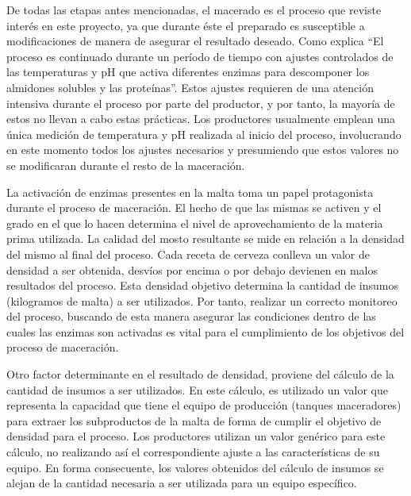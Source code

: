 	\par
	De todas las etapas antes mencionadas, el macerado es el proceso que reviste interés en este proyecto, ya que durante éste el preparado es susceptible a modificaciones de manera de asegurar el resultado deseado. Como explica \cite{Papazian} “El proceso es continuado durante un período de tiempo con ajustes controlados de las temperaturas y pH que activa diferentes enzimas para descomponer los almidones solubles y las proteínas”. Estos ajustes requieren de una atención intensiva durante el proceso por parte del productor, y por tanto, la mayoría de estos no llevan a cabo estas prácticas. Los productores usualmente emplean una única medición de temperatura y pH realizada al inicio del proceso, involucrando en este momento todos los ajustes necesarios y presumiendo que estos valores no se modificaran durante el resto de la maceración.
	\par
	La activación de enzimas presentes en la malta toma un papel protagonista durante el proceso de maceración. El hecho de que las mismas se activen y el grado en el que lo hacen determina el nivel de aprovechamiento de la materia prima utilizada. La calidad del mosto resultante se mide en relación a la densidad del mismo al final del proceso. Cada receta de cerveza conlleva un valor de densidad a ser obtenida, desvíos por encima o por debajo devienen en malos resultados del proceso. Esta densidad objetivo determina la cantidad de insumos (kilogramos de malta) a ser utilizados. Por tanto, realizar un correcto monitoreo del proceso, buscando de esta manera asegurar las condiciones dentro de las cuales las enzimas son activadas es vital para el cumplimiento de los objetivos del proceso de maceración.
	
	\par
	Otro factor determinante en el resultado de densidad, proviene del cálculo de la cantidad de insumos a ser utilizados. En este cálculo, es utilizado un valor que representa la capacidad que tiene el equipo de producción (tanques maceradores) para extraer los subproductos de la malta de forma de cumplir el objetivo de densidad para el proceso. Los productores utilizan un valor genérico para este cálculo, no realizando así el correspondiente ajuste a las características de su equipo. En forma consecuente, los valores obtenidos del cálculo de insumos se alejan de la cantidad necesaria a ser utilizada para un equipo específico.
	
